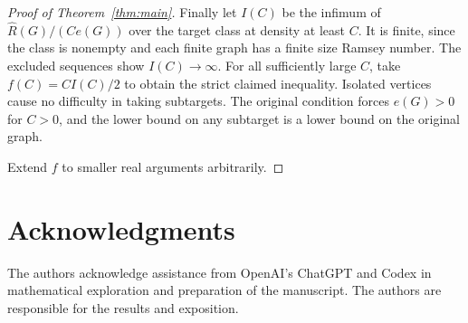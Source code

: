 \documentclass[11pt]{amsart}
\theoremstyle{definition}
\theoremstyle{remark}
\numberwithin{equation}{section}
\begin{document}
\begin{proof}[Proof of Theorem~\ref{thm:main}]
Finally let $I(C)$ be the infimum of $\widehat R(G)/(Ce(G))$ over the target class at density at least $ C $. It is finite, since the class is nonempty and each finite graph has a finite size Ramsey number. The excluded sequences show $ I(C)\to\infty $. For all sufficiently large $ C $, take $ f(C)=CI(C)/2$ to obtain the strict claimed inequality. Isolated vertices cause no difficulty in taking subtargets. The original condition forces $ e(G)>0$ for $ C>0$, and the lower bound on any subtarget is a lower bound on the original graph.

Extend $f$ to smaller real arguments arbitrarily.

\end{proof}


\section*{Acknowledgments}
The authors acknowledge assistance from OpenAI's ChatGPT and Codex in
mathematical exploration and preparation of the manuscript. The authors
are responsible for the results and exposition.
\end{document}
